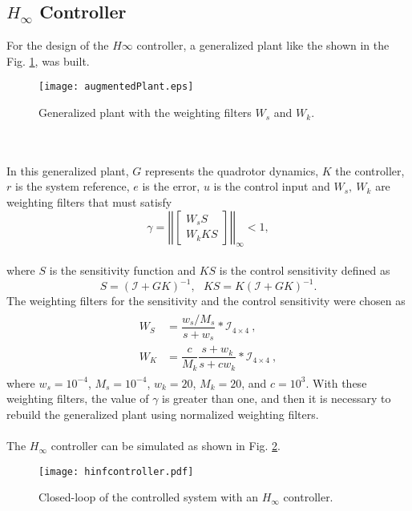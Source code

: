\subsection{$H_\infty$ Controller}
For the design of the $H\infty$ controller, a generalized plant like the shown in the Fig. \ref{fig:augmentedPlant}, was built.
\begin{figure}[h]
	\begin{center}
	\texttt{[image: augmentedPlant.eps]}
	\caption{Generalized plant with the weighting filters $W_s$ and $W_k$.}
	\label{fig:augmentedPlant}
	\end{center}
	\end{figure}	
\\\\In this generalized plant, $G$ represents the quadrotor dynamics, $K$ the controller, $r$ is the system reference, $e$ is the error, $u$ is the control input and $W_{s},\ W_{k}$ are weighting filters that must satisfy 
	\begin{equation}\label{eqn:hinf}
	\gamma = \left|\left|\begin{bmatrix}
	W_{s}S\\W_{k}KS
	\end{bmatrix}\right|\right|_{\infty} < 1,
	\end{equation}
\\where $S$ is the sensitivity function and $KS$ is the control sensitivity defined as
	\begin{equation}
	S = (\mathcal{I} + GK)^{-1},\ \ \ KS = K(\mathcal{I} + GK)^{-1}.
	\end{equation}
The weighting filters for the sensitivity and the control sensitivity were chosen as
\begin{align}\label{eqn:wswk}
\begin{split}
W_{S} &= \dfrac{w_{s}/M_{s}}{s + w_{s}}*\mathcal{I}_{4\times4}\ ,\\
W_{K} &= \dfrac{c}{M_{k}}\dfrac{s+w_{k}}{s+cw_{k}}*\mathcal{I}_{4\times4}\ ,
\end{split}
\end{align}
where $w_{s} = 10^{-4}$, $M_{s} = 10^{-4}$, $w_{k} = 20$, $M_{k} = 20$, and $c = 10^{3}$. With these weighting filters, the value of $\gamma$ is greater than one, and then it is necessary to rebuild the generalized plant using normalized weighting filters.
\\\\The $H_{\infty}$ controller can be simulated as shown in Fig. \ref{fig:hinfcontroller}.
	\begin{figure}[h]
	\begin{center}
	\texttt{[image: hinfcontroller.pdf]}
	\caption{Closed-loop of the controlled system with an $H_{\infty}$ controller.}
	\label{fig:hinfcontroller}
	\end{center}
	\end{figure}
